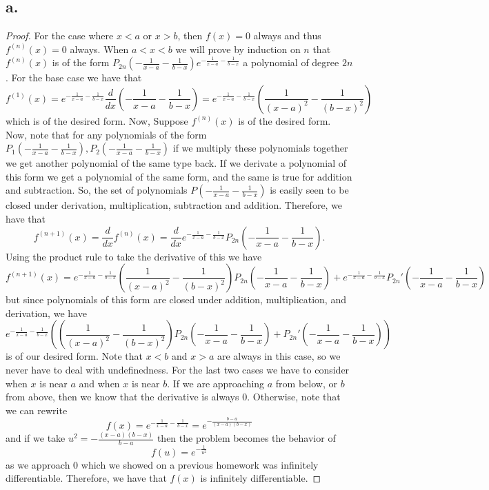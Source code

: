 \documentclass{article}
\begin{document}
\subsection*{a.}
\begin{proof}
   For the case where $x < a$ or $x > b$, then $f(x) = 0$ always and thus $f^{(n)}(x) = 0$ always. When $a < x < b$ we will prove by induction on $n$ that $f^{(n)}(x)$ is of the form $P_{2n}\left(-\frac{1}{x - a} - \frac{1}{b - x} \right)e^{-\frac{1}{x - a} - \frac{1}{b - x}}$ a polynomial of degree $2n$. For the base case we have that 
   \[
   f^{(1)}(x) = e^{- \frac{1}{x - a} - \frac{1}{b - x}}  \frac{d}{dx} \left(- \frac{1}{x - a} - \frac{1}{b - x} \right) = e^{- \frac{1}{x - a} - \frac{1}{b - x}}\left( \frac{1}{( x- a)^2} - \frac{1}{(b - x)^2}\right) 
   \] 
   which is of the desired form. Now, Suppose $f^{(n)}(x)$ is of the desired form. Now, note that for any polynomials of the form $P_1(- \frac{1}{x - a} - \frac{1}{b - x}), P_2( - \frac{1}{x - a} - \frac{1}{b - x})$ if we multiply these polynomials together we get another polynomial of the same type back. If we derivate a polynomial of this form we get a polynomial of the same form, and the same is true for addition and subtraction. So, the set of polynomials $P(- \frac{1}{x - a} - \frac{1}{b - x})$ is easily seen to be closed under derivation, multiplication, subtraction and addition. Therefore, we have that 
   \[
    f^{(n + 1)}(x) = \frac{d}{dx}f^{(n)}(x) =\frac{d}{dx}  e^{-\frac{1}{x - a} - \frac{1}{b - x}}P_{2n}\left( - \frac{1}{x - a} - \frac{1}{ b - x} \right).
    \]
    Using the product rule to take the derivative of this we have  
    \[
        f^{(n + 1)}(x) = e^{-\frac{1}{x - a} - \frac{1}{b - x}} \left( \frac{1}{(x - a)^2} - \frac{1}{(b - x)^2}\right)P_{2n}\left( - \frac{1}{x - a} - \frac{1}{ b - x} \right) + e^{-\frac{1}{x - a} - \frac{1}{b - x}}P_{2n}'\left( - \frac{1}{x - a} - \frac{1}{ b - x} \right)
    \]
    but since polynomials of this form are closed under addition, multiplication, and derivation, we have 
    \[
        e^{-\frac{1}{x - a} - \frac{1}{b - x}} \left(\left( \frac{1}{(x - a)^2} - \frac{1}{(b - x)^2}\right)P_{2n}\left( - \frac{1}{x - a} - \frac{1}{ b - x} \right) + P_{2n}'\left( - \frac{1}{x - a} - \frac{1}{ b - x} \right)\right)    
    \]
    is of our desired form. Note that $x < b$ and $x > a$ are always in this case, so we never have to deal with undefinedness. For the last two cases we have to consider when $x$ is near $a$ and when $x$ is near $b$. If we are approaching $a$ from below, or $b$ from above, then we know that the derivative is always $0$. Otherwise, note that we can rewrite 
    \[
    f(x) = e^{-\frac{1}{x - a} - \frac{1}{b - x}} = e^{- \frac{b - a}{(x - a)(b - x)}}   
    \]
    and if we take $u^2 = -\frac{(x - a)(b - x)}{b - a}$ then the problem becomes the behavior of
    \[
    f(u) = e^{-\frac{1}{u^2}}    
    \] 
    as we approach $0$ which we showed on a previous homework was infinitely differentiable. Therefore, we have that $f(x)$ is infinitely differentiable. 
\end{proof}
\end{document}
